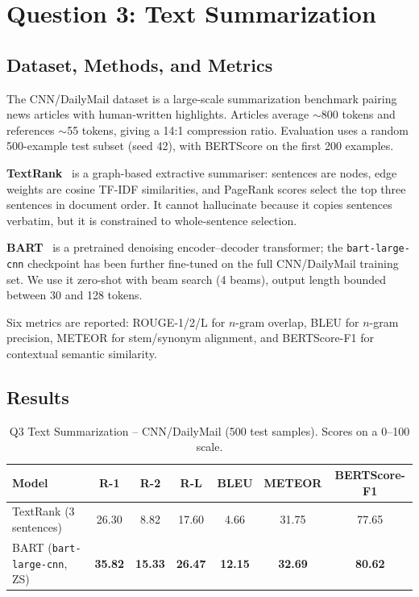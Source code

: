\documentclass[11pt,a4paper]{article}
\begin{document}
\section{Question 3: Text Summarization}

\subsection{Dataset, Methods, and Metrics}
The CNN/DailyMail dataset is a large-scale summarization benchmark pairing news articles with human-written highlights. Articles average $\sim$800 tokens and references $\sim$55 tokens, giving a 14:1 compression ratio. Evaluation uses a random 500-example test subset (seed 42), with BERTScore on the first 200 examples.

\textbf{TextRank}~\cite{mihalcea2004textrank} is a graph-based extractive summariser: sentences are nodes, edge weights are cosine TF-IDF similarities, and PageRank scores select the top three sentences in document order. It cannot hallucinate because it copies sentences verbatim, but it is constrained to whole-sentence selection.

\textbf{BART}~\cite{lewis2020bart} is a pretrained denoising encoder--decoder transformer; the \texttt{bart-large-cnn} checkpoint has been further fine-tuned on the full CNN/DailyMail training set. We use it zero-shot with beam search (4 beams), output length bounded between 30 and 128 tokens.

Six metrics are reported: ROUGE-1/2/L for $n$-gram overlap, BLEU for $n$-gram precision, METEOR for stem/synonym alignment, and BERTScore-F1 for contextual semantic similarity.

\subsection{Results}

\begin{table}[H]
\centering
\caption{Q3 Text Summarization -- CNN/DailyMail (500 test samples). Scores on a 0--100 scale.}
\label{tab:q3}
\begin{tabular}{lcccccc}
\toprule
\textbf{Model} & \textbf{R-1} & \textbf{R-2} & \textbf{R-L} & \textbf{BLEU} & \textbf{METEOR} & \textbf{BERTScore-F1} \\
\midrule
TextRank (3 sentences) & 26.30 & 8.82 & 17.60 & 4.66 & 31.75 & 77.65 \\
BART (\texttt{bart-large-cnn}, ZS) & \textbf{35.82} & \textbf{15.33} & \textbf{26.47} & \textbf{12.15} & \textbf{32.69} & \textbf{80.62} \\
\bottomrule
\end{tabular}
\end{table}
\end{document}
